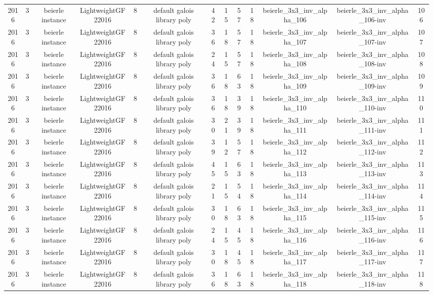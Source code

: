 \begin{tabular}{c c c c c c c c c c c c c}
2016 & 3 & beierle instance & LightweightGF22016 & 8 & default galois library poly & 42 & 15 & 57 & 18 & beierle_3x3_inv_alpha_106 & beierle_3x3_inv_alpha_106-inv & 106 \\
2016 & 3 & beierle instance & LightweightGF22016 & 8 & default galois library poly & 36 & 18 & 57 & 18 & beierle_3x3_inv_alpha_107 & beierle_3x3_inv_alpha_107-inv & 107 \\
2016 & 3 & beierle instance & LightweightGF22016 & 8 & default galois library poly & 24 & 15 & 57 & 18 & beierle_3x3_inv_alpha_108 & beierle_3x3_inv_alpha_108-inv & 108 \\
2016 & 3 & beierle instance & LightweightGF22016 & 8 & default galois library poly & 36 & 18 & 63 & 18 & beierle_3x3_inv_alpha_109 & beierle_3x3_inv_alpha_109-inv & 109 \\
2016 & 3 & beierle instance & LightweightGF22016 & 8 & default galois library poly & 36 & 18 & 39 & 18 & beierle_3x3_inv_alpha_110 & beierle_3x3_inv_alpha_110-inv & 110 \\
2016 & 3 & beierle instance & LightweightGF22016 & 8 & default galois library poly & 30 & 21 & 39 & 18 & beierle_3x3_inv_alpha_111 & beierle_3x3_inv_alpha_111-inv & 111 \\
2016 & 3 & beierle instance & LightweightGF22016 & 8 & default galois library poly & 39 & 12 & 57 & 18 & beierle_3x3_inv_alpha_112 & beierle_3x3_inv_alpha_112-inv & 112 \\
2016 & 3 & beierle instance & LightweightGF22016 & 8 & default galois library poly & 45 & 15 & 63 & 18 & beierle_3x3_inv_alpha_113 & beierle_3x3_inv_alpha_113-inv & 113 \\
2016 & 3 & beierle instance & LightweightGF22016 & 8 & default galois library poly & 21 & 15 & 54 & 18 & beierle_3x3_inv_alpha_114 & beierle_3x3_inv_alpha_114-inv & 114 \\
2016 & 3 & beierle instance & LightweightGF22016 & 8 & default galois library poly & 30 & 18 & 63 & 18 & beierle_3x3_inv_alpha_115 & beierle_3x3_inv_alpha_115-inv & 115 \\
2016 & 3 & beierle instance & LightweightGF22016 & 8 & default galois library poly & 24 & 15 & 45 & 18 & beierle_3x3_inv_alpha_116 & beierle_3x3_inv_alpha_116-inv & 116 \\
2016 & 3 & beierle instance & LightweightGF22016 & 8 & default galois library poly & 30 & 18 & 45 & 18 & beierle_3x3_inv_alpha_117 & beierle_3x3_inv_alpha_117-inv & 117 \\
2016 & 3 & beierle instance & LightweightGF22016 & 8 & default galois library poly & 36 & 18 & 63 & 18 & beierle_3x3_inv_alpha_118 & beierle_3x3_inv_alpha_118-inv & 118 \\

\end{tabular}
